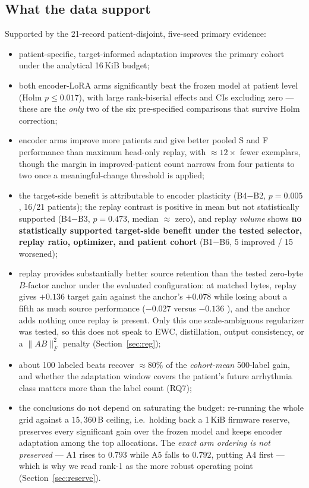 \subsection{What the data support}

Supported by the 21-record patient-disjoint, five-seed primary evidence:
\begin{itemize}[leftmargin=*]
\item patient-specific, target-informed adaptation improves the primary cohort
under the analytical 16\,KiB budget;
\item both encoder-LoRA arms significantly beat the frozen model at patient level
(Holm $p\le0.017$), with large rank-biserial effects and CIs excluding zero ---
these are the \emph{only} two of the six pre-specified comparisons that survive
Holm correction;
\item encoder arms improve more patients and give better pooled S and F
performance than maximum head-only replay, with $\approx 12\times$ fewer
exemplars, though the margin in improved-patient count narrows from four patients
to two once a meaningful-change threshold is applied;
\item the target-side benefit is attributable to encoder plasticity (B4$-$B2,
$p = 0.005$, 16/21 patients); the replay contrast is positive in mean but not
statistically supported (B4$-$B3, $p = 0.473$, median $\approx$ zero), and replay
\emph{volume} shows \textbf{no statistically supported target-side benefit
under the tested selector, replay ratio, optimizer, and patient cohort}
(B1$-$B6, 5 improved / 15 worsened);
\item replay provides substantially better source retention than the tested
zero-byte $B$-factor anchor under the evaluated configuration: at matched bytes,
replay gives $+0.136$ target gain against the anchor's $+0.078$ while losing
about a fifth as much source performance ($-0.027$ versus $-0.136$ \macrof{}),
and the anchor adds nothing once replay is present. Only this one
scale-ambiguous regularizer was tested, so this does not speak to EWC,
distillation, output consistency, or a $\|AB\|_F^2$ penalty
(Section~\ref{sec:reg});
\item about 100 labeled beats recover $\approx 80\%$ of the \emph{cohort-mean}
500-label gain, and whether the adaptation window covers the patient's future
arrhythmia class matters more than the label count (RQ7);
\item the conclusions do not depend on saturating the budget: re-running the
whole grid against a $15{,}360$\,B ceiling, i.e.\ holding back a 1\,KiB firmware
reserve, preserves every significant gain over the frozen model and keeps
encoder adaptation among the top allocations. The \emph{exact arm ordering is
not preserved} --- A1 rises to $0.793$ while A5 falls to $0.792$, putting A4
first --- which is why we read rank-1 as the more robust operating point
(Section~\ref{sec:reserve}).
\end{itemize}

